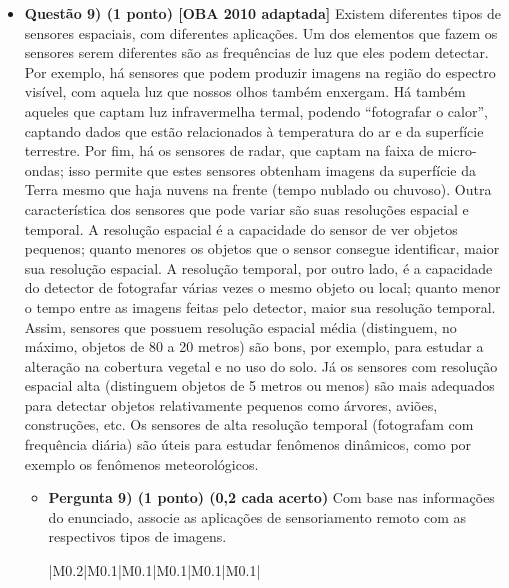\documentclass[a4paper, 12pt]{article}
\begin{document}
\begin{flushleft}
\begin{itemize}
            \item \textbf{Questão 9) (1 ponto) [OBA 2010 adaptada]} Existem diferentes tipos de sensores espaciais, com diferentes aplicações. \linebreak \linebreak Um dos elementos que fazem os sensores serem diferentes são as frequências de luz que eles podem detectar. Por exemplo, há sensores que podem produzir imagens na região do espectro visível, com aquela luz que nossos olhos também enxergam. Há também aqueles que captam luz infravermelha termal, podendo “fotografar o calor”, captando dados que estão relacionados à temperatura do ar e da superfície terrestre. Por fim, há os sensores de radar, que captam na faixa de micro-ondas; isso permite que estes sensores obtenham imagens da superfície da Terra mesmo que haja nuvens na frente (tempo nublado ou chuvoso). \linebreak \linebreak Outra característica dos sensores que pode variar são suas resoluções espacial e temporal. A resolução espacial é a capacidade do sensor de ver objetos pequenos; quanto menores os objetos que o sensor consegue identificar, maior sua resolução espacial. A resolução temporal, por outro lado, é a capacidade do detector de fotografar várias vezes o mesmo objeto ou local; quanto menor o tempo entre as imagens feitas pelo detector, maior sua resolução temporal. \linebreak \linebreak Assim, sensores que possuem resolução espacial média (distinguem, no máximo, objetos de 80 a 20 metros) são bons, por exemplo, para estudar a alteração na cobertura vegetal e no uso do solo. Já os sensores com resolução espacial alta (distinguem objetos de 5 metros ou menos) são mais adequados para detectar objetos relativamente pequenos como árvores, aviões, construções, etc. Os sensores de alta resolução temporal (fotografam com frequência diária) são úteis para estudar fenômenos dinâmicos, como por exemplo os fenômenos meteorológicos.
                \begin{itemize}
                    \item \textbf{Pergunta 9) (1 ponto) (0,2 cada acerto)} Com base nas informações do enunciado, associe as aplicações de sensoriamento remoto com as respectivos tipos de imagens.
                        \begin{center} \begin{tabular}
                        {
                            |M{0.2\textwidth}|M{0.1\textwidth}|M{0.1\textwidth}|M{0.1\textwidth}|M{0.1\textwidth}|M{0.1\textwidth}|
}
\end{tabular}
\end{center}
\end{itemize}
\end{itemize}
\end{flushleft}
\end{document}
